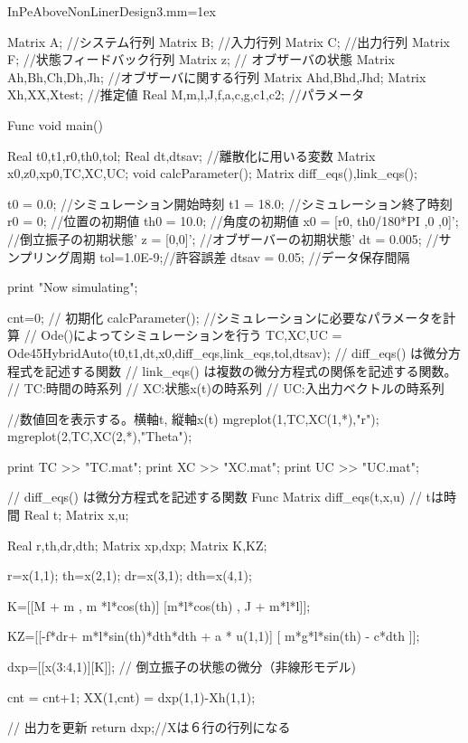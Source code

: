 	\begin{breakitembox}[l]{InPeAboveNonLinerDesign3.mm}\baselineskip=1ex
		\begin{verbatimtab}[4]
		
Matrix A; //システム行列
Matrix B; //入力行列
Matrix C; //出力行列
Matrix F; //状態フィードバック行列
Matrix z; // オブザーバの状態
Matrix Ah,Bh,Ch,Dh,Jh; //オブザーバに関する行列
Matrix Ahd,Bhd,Jhd;
Matrix Xh,XX,Xtest; //推定値
Real M,m,l,J,f,a,c,g,c1,c2; //パラメータ

Func void main()
{
	Real t0,t1,r0,th0,tol;
	Real dt,dtsav; //離散化に用いる変数
	Matrix x0,z0,xp0,TC,XC,UC;
	void calcParameter();
	Matrix diff_eqs(),link_eqs();
	
	t0 = 0.0; //シミュレーション開始時刻
	t1 = 18.0; //シミュレーション終了時刻
	r0 = 0; //位置の初期値
	th0 = 10.0; //角度の初期値
	x0 = [r0, th0/180*PI ,0 ,0]'; //倒立振子の初期状態'
	z = [0,0]'; //オブザーバーの初期状態'
	dt = 0.005; //サンプリング周期
	tol=1.0E-9;//許容誤差
	dtsav = 0.05; //データ保存間隔
	
	print "Now simulating\n";
	
	cnt=0; // 初期化
    calcParameter(); //シミュレーションに必要なパラメータを計算
	// Ode()によってシミュレーションを行う
	{TC,XC,UC} =
	 Ode45HybridAuto(t0,t1,dt,x0,diff_eqs,link_eqs,tol,dtsav);
	// diff_eqs() は微分方程式を記述する関数
	// link_eqs() は複数の微分方程式の関係を記述する関数。
	// TC:時間の時系列
	// XC:状態x(t)の時系列
	// UC:入出力ベクトルの時系列
	
	//数値回を表示する。横軸t, 縦軸x(t)
	mgreplot(1,TC,XC(1,*),{"r"});
	mgreplot(2,TC,XC(2,*),{"Theta"});
	
	print TC >> "TC.mat";
	print XC >> "XC.mat";
	print UC >> "UC.mat";
}



// diff_eqs() は微分方程式を記述する関数
Func Matrix diff_eqs(t,x,u)
// tは時間
Real t;
Matrix x,u;
{
	Real r,th,dr,dth;
	Matrix xp,dxp;
	Matrix K,KZ;
	
	r=x(1,1);
	th=x(2,1);
	dr=x(3,1);
	dth=x(4,1);

	K=[[M + m , m *l*cos(th)]
	   [m*l*cos(th) , J + m*l*l]];

	KZ=[[-f*dr+ m*l*sin(th)*dth*dth + a * u(1,1)]
		[ m*g*l*sin(th) - c*dth ]];
	
	dxp=[[x(3:4,1)][K\KZ]]; // 倒立振子の状態の微分（非線形モデル)
	
	cnt = cnt+1;
	XX(1,cnt) = dxp(1,1)-Xh(1,1);

    // 出力を更新
	return dxp;//Xは６行の行列になる
}




\end{verbatimtab}
\end{breakitembox}
